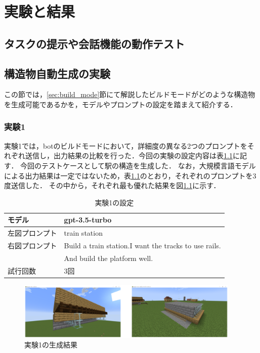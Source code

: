 \chapter{実験と結果}	
\thispagestyle{plain}   %

\section{タスクの提示や会話機能の動作テスト}\label{sec:gpt_res_test}


\section{構造物自動生成の実験}\label{sec:build_mode_generate}
この節では，\ref{sec:build_mode}節にて解説したビルドモードがどのような構造物を生成可能であるかを，モデルやプロンプトの設定を踏まえて紹介する．

\subsection{実験1}\label{sec:ex1}
実験1では，botのビルドモードにおいて，詳細度の異なる2つのプロンプトをそれぞれ送信し，出力結果の比較を行った．今回の実験の設定内容は表\ref{tab:setting1}に記す．
今回のテストケースとして駅の構造を生成した．
なお，大規模言語モデルによる出力結果は一定ではないため，表\ref{tab:setting1}のとおり，それぞれのプロンプトを3度送信した．
その中から，それぞれ最も優れた結果を図\ref{fig:station1}に示す．
\begin{table}[H]
    \caption{実験1の設定}\label{tab:setting1}
    \centering
    \begin{tabular}{ll}
        \hline \hline
        モデル & gpt-3.5-turbo \\
        \hline
        左図プロンプト & train station \\
        \hline
        右図プロンプト & Build a train station.I want the tracks to use rails. \\
        　 & And build the platform well. \\
        \hline
        試行回数 & 3回 \\
        \hline
    \end{tabular}
\end{table}

\begin{figure}[H]
    \centering
    \includegraphics[width=0.95\textwidth]{fig/train_station1.PNG}
    \caption{実験1の生成結果}
    \label{fig:station1}
\end{figure}

